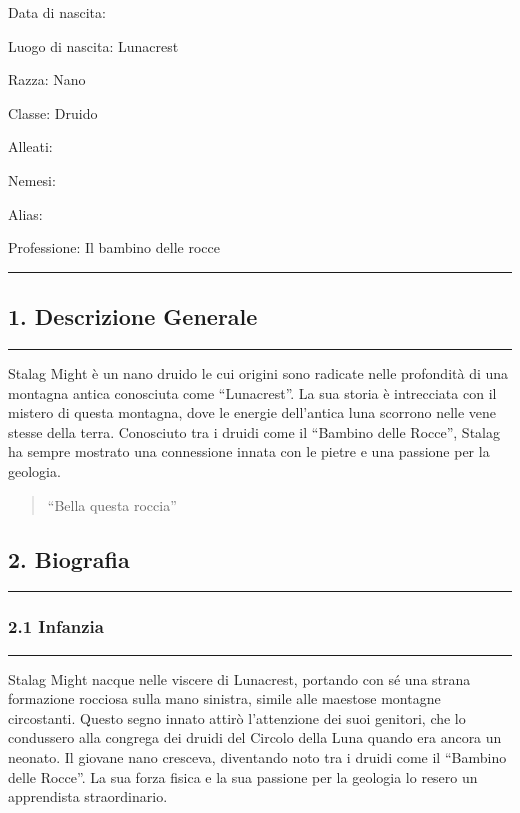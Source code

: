 Data di nascita:

Luogo di nascita: Lunacrest

Razza: Nano

Classe: Druido

Alleati:

Nemesi:

Alias:

Professione: Il bambino delle rocce

\begin{center}\rule{0.5\linewidth}{0.5pt}\end{center}

\subsection{1. Descrizione Generale}\label{descrizione-generale}

\begin{center}\rule{0.5\linewidth}{0.5pt}\end{center}

Stalag Might è un nano druido le cui origini sono radicate nelle
profondità di una montagna antica conosciuta come ``Lunacrest''. La sua
storia è intrecciata con il mistero di questa montagna, dove le energie
dell'antica luna scorrono nelle vene stesse della terra. Conosciuto tra
i druidi come il ``Bambino delle Rocce'', Stalag ha sempre mostrato una
connessione innata con le pietre e una passione per la geologia.

\begin{quote}
``Bella questa roccia''
\end{quote}

\subsection{2. Biografia}\label{biografia}

\begin{center}\rule{0.5\linewidth}{0.5pt}\end{center}

\subsubsection{2.1 Infanzia}\label{infanzia}

\begin{center}\rule{0.5\linewidth}{0.5pt}\end{center}

Stalag Might nacque nelle viscere di Lunacrest, portando con sé una
strana formazione rocciosa sulla mano sinistra, simile alle maestose
montagne circostanti. Questo segno innato attirò l'attenzione dei suoi
genitori, che lo condussero alla congrega dei druidi del Circolo della
Luna quando era ancora un neonato. Il giovane nano cresceva, diventando
noto tra i druidi come il ``Bambino delle Rocce''. La sua forza fisica e
la sua passione per la geologia lo resero un apprendista straordinario.

